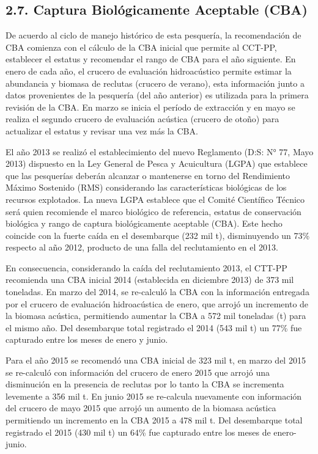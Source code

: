 \documentclass[
  spanish,
]{article}
\begin{document}
\hypertarget{captura-bioluxf3gicamente-aceptable-cba}{%
\subsection{2.7. Captura Biológicamente Aceptable
(CBA)}\label{captura-bioluxf3gicamente-aceptable-cba}}

De acuerdo al ciclo de manejo histórico de esta pesquería, la
recomendación de CBA comienza con el cálculo de la CBA inicial que
permite al CCT-PP, establecer el estatus y recomendar el rango de CBA
para el año siguiente. En enero de cada año, el crucero de evaluación
hidroacústico permite estimar la abundancia y biomasa de reclutas
(crucero de verano), esta información junto a datos provenientes de la
pesquería (del año anterior) es utilizada para la primera revisión de la
CBA. En marzo se inicia el período de extracción y en mayo se realiza el
segundo crucero de evaluación acústica (crucero de otoño) para
actualizar el estatus y revisar una vez más la CBA.

El año 2013 se realizó el establecimiento del nuevo Reglamento (D:S: N°
77, Mayo 2013) dispuesto en la Ley General de Pesca y Acuicultura (LGPA)
que establece que las pesquerías deberán alcanzar o mantenerse en torno
del Rendimiento Máximo Sostenido (RMS) considerando las características
biológicas de los recursos explotados. La nueva LGPA establece que el
Comité Científico Técnico será quien recomiende el marco biológico de
referencia, estatus de conservación biológica y rango de captura
biológicamente aceptable (CBA). Este hecho coincide con la fuerte caída
en el desembarque (232 mil t), disminuyendo un 73\% respecto al año
2012, producto de una falla del reclutamiento en el 2013.

En consecuencia, considerando la caída del reclutamiento 2013, el CTT-PP
recomienda una CBA inicial 2014 (establecida en diciembre 2013) de 373
mil toneladas. En marzo del 2014, se re-calculó la CBA con la
información entregada por el crucero de evaluación hidroacústica de
enero, que arrojó un incremento de la biomasa acústica, permitiendo
aumentar la CBA a 572 mil toneladas (t) para el mismo año. Del
desembarque total registrado el 2014 (543 mil t) un 77\% fue capturado
entre los meses de enero y junio.

Para el año 2015 se recomendó una CBA inicial de 323 mil t, en marzo del
2015 se re-calculó con información del crucero de enero 2015 que arrojó
una disminución en la presencia de reclutas por lo tanto la CBA se
incrementa levemente a 356 mil t. En junio 2015 se re-calcula nuevamente
con información del crucero de mayo 2015 que arrojó un aumento de la
biomasa acústica permitiendo un incremento en la CBA 2015 a 478 mil t.
Del desembarque total registrado el 2015 (430 mil t) un 64\% fue
capturado entre los meses de enero-junio.
\end{document}
